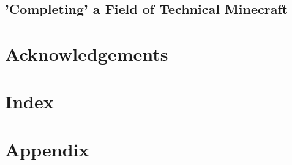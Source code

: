 \documentclass[11pt,a4paper]{article}
\begin{document}
    \subsection{'Completing' a Field of Technical Minecraft}
    \lipsum[20]


\newpage
\section*{Acknowledgements}
\newpage
\section*{Index}

\newpage
\section*{Appendix}
\end{document}
